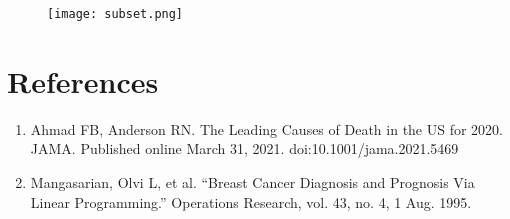 \documentclass[10pt]{article}
\begin{document}
\begin{figure}[htbp]
\centerline{\texttt{[image: subset.png]}}
\end{figure}

\newpage
\section{References}

\begin{enumerate}
	\item Ahmad FB, Anderson RN. The Leading Causes of Death in the US for 2020. JAMA. Published online March 31, 2021. doi:10.1001/jama.2021.5469

	\item Mangasarian, Olvi L, et al. “Breast Cancer Diagnosis and Prognosis Via Linear Programming.” Operations Research, vol. 43, no. 4, 1 Aug. 1995. 

\end{enumerate}
\end{document}
